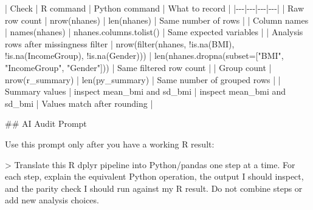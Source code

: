 \documentclass[
  letterpaper,
  DIV=11,
  numbers=noendperiod,
  oneside]{scrreprt}
\newenvironment{Shaded}{\begin{snugshade}}{\end{snugshade}}
\newcommand{\AttributeTok}[1]{\textcolor[rgb]{0.40,0.45,0.13}{#1}}
\newcommand{\FunctionTok}[1]{\textcolor[rgb]{0.28,0.35,0.67}{#1}}
\newcommand{\InformationTok}[1]{\textcolor[rgb]{0.37,0.37,0.37}{#1}}
\newcommand{\NormalTok}[1]{\textcolor[rgb]{0.00,0.23,0.31}{#1}}
\newcommand{\PreprocessorTok}[1]{\textcolor[rgb]{0.68,0.00,0.00}{#1}}
\begin{document}
\begin{Shaded}
\begin{Highlighting}[numbers=left,,]
\PreprocessorTok{|}\NormalTok{ Check }\PreprocessorTok{|}\NormalTok{ R command }\PreprocessorTok{|}\NormalTok{ Python command }\PreprocessorTok{|}\NormalTok{ What to record }\PreprocessorTok{|}
\PreprocessorTok{|{-}{-}{-}|{-}{-}{-}|{-}{-}{-}|{-}{-}{-}|}
\PreprocessorTok{|}\NormalTok{ Raw row count }\PreprocessorTok{|} \InformationTok{\textasciigrave{}nrow(nhanes)\textasciigrave{}} \PreprocessorTok{|} \InformationTok{\textasciigrave{}len(nhanes)\textasciigrave{}} \PreprocessorTok{|}\NormalTok{ Same number of rows }\PreprocessorTok{|}
\PreprocessorTok{|}\NormalTok{ Column names }\PreprocessorTok{|} \InformationTok{\textasciigrave{}names(nhanes)\textasciigrave{}} \PreprocessorTok{|} \InformationTok{\textasciigrave{}nhanes.columns.tolist()\textasciigrave{}} \PreprocessorTok{|}\NormalTok{ Same expected variables }\PreprocessorTok{|}
\PreprocessorTok{|}\NormalTok{ Analysis rows after missingness filter }\PreprocessorTok{|} \InformationTok{\textasciigrave{}nrow(filter(nhanes, !is.na(BMI), !is.na(IncomeGroup), !is.na(Gender)))\textasciigrave{}} \PreprocessorTok{|} \InformationTok{\textasciigrave{}len(nhanes.dropna(subset=["BMI", "IncomeGroup", "Gender"]))\textasciigrave{}} \PreprocessorTok{|}\NormalTok{ Same filtered row count }\PreprocessorTok{|}
\PreprocessorTok{|}\NormalTok{ Group count }\PreprocessorTok{|} \InformationTok{\textasciigrave{}nrow(r\_summary)\textasciigrave{}} \PreprocessorTok{|} \InformationTok{\textasciigrave{}len(py\_summary)\textasciigrave{}} \PreprocessorTok{|}\NormalTok{ Same number of grouped rows }\PreprocessorTok{|}
\PreprocessorTok{|}\NormalTok{ Summary values }\PreprocessorTok{|}\NormalTok{ inspect }\InformationTok{\textasciigrave{}mean\_bmi\textasciigrave{}}\NormalTok{ and }\InformationTok{\textasciigrave{}sd\_bmi\textasciigrave{}} \PreprocessorTok{|}\NormalTok{ inspect }\InformationTok{\textasciigrave{}mean\_bmi\textasciigrave{}}\NormalTok{ and }\InformationTok{\textasciigrave{}sd\_bmi\textasciigrave{}} \PreprocessorTok{|}\NormalTok{ Values match after rounding }\PreprocessorTok{|}

\FunctionTok{\#\# AI Audit Prompt}

\NormalTok{Use this prompt only after you have a working R result:}

\AttributeTok{\textgreater{} Translate this R }\InformationTok{\textasciigrave{}dplyr\textasciigrave{}}\AttributeTok{ pipeline into Python/pandas one step at a time. For each step, explain the equivalent Python operation, the output I should inspect, and the parity check I should run against my R result. Do not combine steps or add new analysis choices.}


\end{Highlighting}
\end{Shaded}
\end{document}
